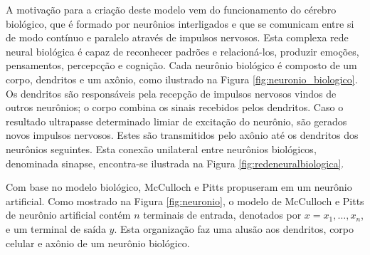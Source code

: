 A motivação para a criação deste modelo vem do funcionamento do cérebro biológico, que é formado por neurônios interligados e que se comunicam entre si de modo contínuo e paralelo através de impulsos nervosos. Esta complexa rede neural biológica é capaz de reconhecer padrões e relacioná-los, produzir emoções, pensamentos, percepcção e cognição. Cada neurônio biológico é composto de um corpo, dendritos e um axônio, como ilustrado na Figura \ref{fig:neuronio_biologico}. Os dendritos são responsáveis pela recepção de impulsos nervosos vindos de outros neurônios; o corpo combina os sinais recebidos pelos dendritos. Caso o resultado ultrapasse determinado limiar de excitação do neurônio, são gerados novos impulsos nervosos. Estes são transmitidos pelo axônio até os dendritos dos neurônios seguintes. Esta conexão unilateral entre neurônios biológicos, denominada sinapse, encontra-se ilustrada na Figura \ref{fig:redeneuralbiologica}.

Com base no modelo biológico, McCulloch e Pitts propuseram em \cite{mcculloch1943logical} um neurônio artificial. Como mostrado na Figura \ref{fig:neuronio}, o modelo de McCulloch e Pitts de neurônio artificial contém $n$ terminais de entrada, denotados por $x = x_1, \ldots, x_n$, e um terminal de saída $y$. Esta organização faz uma alusão aos dendritos, corpo celular e axônio de um neurônio biológico.


